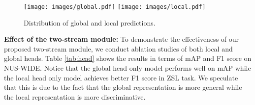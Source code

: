 \documentclass[letterpaper]{article} \usepackage{aaai23}  \usepackage{times}  \usepackage{helvet}  \usepackage{courier}  \usepackage[hyphens]{url}  \usepackage{graphicx} \urlstyle{rm} \def\UrlFont{\rm}  \usepackage{natbib}  \usepackage{caption} \frenchspacing  \setlength{\pdfpagewidth}{8.5in}  \setlength{\pdfpageheight}{11in}
\begin{document}
\begin{figure}[t]
  \centering
    {\texttt{[image: images/global.pdf]}}
    {\texttt{[image: images/local.pdf]}}
  \caption{Distribution of global and local predictions.}
  \label{fig:global_local}
\end{figure} 
\begin{table}[t]
\centering


\setlength{\tabcolsep}{6pt}
\caption{Effectiveness of the two-steam module. 
Bold indicates the best, and underline indicates the second best.
}
\label{tab:head}
\end{table} 
\noindent\textbf{Effect of the two-stream module:}
To demonstrate the effectiveness of our proposed two-stream module, we conduct ablation studies of both local and global heads.
Table \ref{tab:head} shows the results in terms of mAP and F1 score on NUS-WIDE.
Notice that the global head only model performs well on mAP while the local head only model achieves better F1 score in ZSL task.
We speculate that this is due to the fact that the global representation is more general while the local representation is more discriminative.
\end{document}
